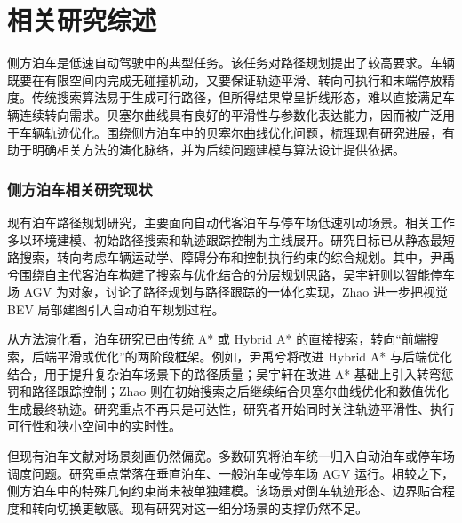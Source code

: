 
\chapter{相关研究综述}

侧方泊车是低速自动驾驶中的典型任务。该任务对路径规划提出了较高要求。车辆既要在有限空间内完成无碰撞机动，又要保证轨迹平滑、转向可执行和末端停放精度。传统搜索算法易于生成可行路径，但所得结果常呈折线形态，难以直接满足车辆连续转向需求。贝塞尔曲线具有良好的平滑性与参数化表达能力，因而被广泛用于车辆轨迹优化。围绕侧方泊车中的贝塞尔曲线优化问题，梳理现有研究进展，有助于明确相关方法的演化脉络，并为后续问题建模与算法设计提供依据。

\subsection{侧方泊车相关研究现状}

现有泊车路径规划研究，主要面向自动代客泊车与停车场低速机动场景\cite{yin2025avp,wu2025agvparking,zhao2024automatedparkingbev}。相关工作多以环境建模、初始路径搜索和轨迹跟踪控制为主线展开。研究目标已从静态最短路搜索，转向考虑车辆运动学、障碍分布和控制执行约束的综合规划。其中，尹禹兮围绕自主代客泊车构建了搜索与优化结合的分层规划思路，吴宇轩则以智能停车场 AGV 为对象，讨论了路径规划与路径跟踪的一体化实现，Zhao 进一步把视觉 BEV 局部建图引入自动泊车规划过程\cite{yin2025avp,wu2025agvparking,zhao2024automatedparkingbev}。

从方法演化看，泊车研究已由传统 A* 或 Hybrid A* 的直接搜索，转向“前端搜索，后端平滑或优化”的两阶段框架\cite{yin2025avp,wu2025agvparking,zhao2024automatedparkingbev}。例如，尹禹兮将改进 Hybrid A* 与后端优化结合，用于提升复杂泊车场景下的路径质量；吴宇轩在改进 A* 基础上引入转弯惩罚和路径跟踪控制；Zhao 则在初始搜索之后继续结合贝塞尔曲线优化和数值优化生成最终轨迹\cite{yin2025avp,wu2025agvparking,zhao2024automatedparkingbev}。研究重点不再只是可达性，研究者开始同时关注轨迹平滑性、执行可行性和狭小空间中的实时性。

但现有泊车文献对场景刻画仍然偏宽。多数研究将泊车统一归入自动泊车或停车场调度问题。研究重点常落在垂直泊车、一般泊车或停车场 AGV 运行\cite{yin2025avp,wu2025agvparking,zhao2024automatedparkingbev}。相较之下，侧方泊车中的特殊几何约束尚未被单独建模。该场景对倒车轨迹形态、边界贴合程度和转向切换更敏感。现有研究对这一细分场景的支撑仍然不足。

